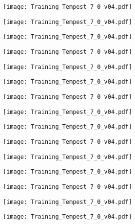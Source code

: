 \documentclass[main.tex]{subfiles}
\begin{document}
\begin{center}
\texttt{[image: Training\_Tempest\_7\_0\_v04.pdf]}
\end{center}

\begin{center}
\texttt{[image: Training\_Tempest\_7\_0\_v04.pdf]}
\end{center}

\begin{center}
\texttt{[image: Training\_Tempest\_7\_0\_v04.pdf]}
\end{center}

\begin{center}
\texttt{[image: Training\_Tempest\_7\_0\_v04.pdf]}
\end{center}

\begin{center}
\texttt{[image: Training\_Tempest\_7\_0\_v04.pdf]}
\end{center}

\begin{center}
\texttt{[image: Training\_Tempest\_7\_0\_v04.pdf]}
\end{center}

\begin{center}
\texttt{[image: Training\_Tempest\_7\_0\_v04.pdf]}
\end{center}

\begin{center}
\texttt{[image: Training\_Tempest\_7\_0\_v04.pdf]}
\end{center}

\begin{center}
\texttt{[image: Training\_Tempest\_7\_0\_v04.pdf]}
\end{center}

\begin{center}
\texttt{[image: Training\_Tempest\_7\_0\_v04.pdf]}
\end{center}

\begin{center}
\texttt{[image: Training\_Tempest\_7\_0\_v04.pdf]}
\end{center}

\begin{center}
\texttt{[image: Training\_Tempest\_7\_0\_v04.pdf]}
\end{center}

\begin{center}
\texttt{[image: Training\_Tempest\_7\_0\_v04.pdf]}
\end{center}

\begin{center}
\texttt{[image: Training\_Tempest\_7\_0\_v04.pdf]}
\end{center}

\begin{center}
\texttt{[image: Training\_Tempest\_7\_0\_v04.pdf]}
\end{center}
\end{document}
